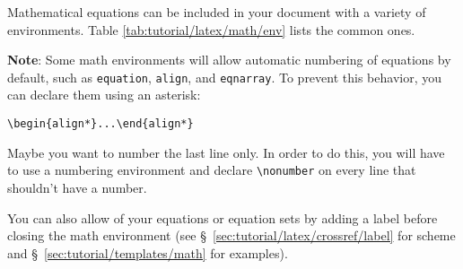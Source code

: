 Mathematical equations can be included in your document with a variety of \glspl{environment}. Table \ref{tab:tutorial/latex/math/env} lists the common ones.

\textbf{Note}: Some math \glspl{environment} will allow automatic numbering of equations by default, such as \texttt{equation}, \texttt{align}, and \texttt{eqnarray}. To prevent this behavior, you can declare them using an asterisk:
\begin{center}
    \verb"\begin{align*}...\end{align*}"
\end{center}

Maybe you want to number the last line only. In order to do this, you will have to use a numbering \gls{environment} and declare \verb"\nonumber" on every line that shouldn't have a number.

You can also allow  of your equations or equation sets by adding a \gls{label} before closing the math \gls{environment} (see \S~\ref{sec:tutorial/latex/crossref/label} for  scheme and \S~\ref{sec:tutorial/templates/math} for examples).

\begingroup
    \setlength{\columnA}{\dimexpr .25\linewidth}
    \setlength{\columnB}{\dimexpr \linewidth-\columnA}
    
    \setlength{\columnA}{\columnA-2\tabcolsep-3\vbar/2}
    \setlength{\columnB}{\columnB-2\tabcolsep-3\vbar/2}
    
